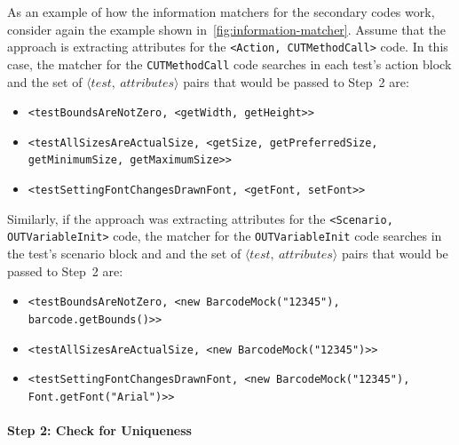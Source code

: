 As an example of how the information matchers for the secondary codes work, consider again the example shown in~\cref{fig:information-matcher}.
%
Assume that the approach is extracting attributes for the \texttt{<Action, CUTMethodCall>} code.
%
In this case, the matcher for the \texttt{CUTMethodCall} code searches in each test's action block and the set of $\langle test,~attributes \rangle$ pairs that would be passed to Step~2 are:
%
\begin{itemize}
    \item \texttt{<testBoundsAreNotZero, <getWidth, getHeight>>}
    \item \texttt{<testAllSizesAreActualSize, <getSize, getPreferredSize, getMinimumSize, getMaximumSize>>}
    \item \texttt{<testSettingFontChangesDrawnFont, <getFont, setFont>>}
\end{itemize}
%
Similarly, if the approach was extracting attributes for the \texttt{<Scenario, OUTVariableInit>} code, the matcher for the \texttt{OUTVariableInit} code searches in the test's scenario block and 
and the set of $\langle test,~attributes \rangle$ pairs that would be passed to Step~2 are:
%
\begin{itemize}
\item \texttt{<testBoundsAreNotZero, <new BarcodeMock("12345"), barcode.getBounds()>>}
    \item \texttt{<testAllSizesAreActualSize, <new~BarcodeMock("12345")>>}
    \item \texttt{<testSettingFontChangesDrawnFont, <new BarcodeMock("12345"), Font.getFont("Arial")>>}
\end{itemize}



\paragraph{Step 2: Check for Uniqueness}

